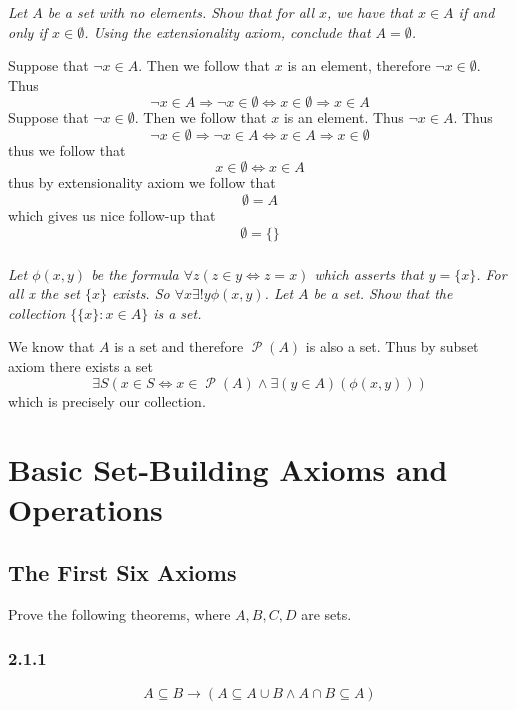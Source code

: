 \documentclass[11pt,oneside,titlepage]{book}
\DeclareMathOperator \pow {\mathcal {P}}
\DeclareMathOperator \lra {\Leftrightarrow}
\DeclareMathOperator \imp {\Rightarrow}
\begin{document}
\subsection{}

\textit{Let $A$ be a set with no elements. Show that for all $x$, we have that $x \in A$ if
  and only if $x \in \emptyset$. Using the extensionality axiom, conclude that $A = \emptyset$.}

Suppose that $\neg x \in A$. Then we follow that $x$ is an element, therefore $\neg x \in \emptyset$.
Thus
$$\neg x \in A \imp \neg x \in \emptyset \iff x \in \emptyset \imp x \in A$$
Suppose that $\neg x \in \emptyset$. Then we follow that $x$ is an element. Thus $\neg x \in A$.
Thus
$$\neg x \in \emptyset \imp \neg x \in A \iff x \in A \imp x \in  \emptyset$$
thus we follow that
$$x \in \emptyset \lra x \in A$$
thus by extensionality axiom we follow that
$$\emptyset = A$$
which gives us nice follow-up that
$$\emptyset = \{\}$$

\subsection{}

\textit{Let $\phi(x, y)$ be the formula $\forall z(z \in y \lra z = x)$ which asserts that
  $y = \{x\}$. For all x the set $\{x\}$ exists. So $\forall x  \exists! y \phi(x, y)$.
  Let $A$ be a set. Show that the collection $\{\{x\}: x \in A\}$ is a set.}

We know that $A$ is a set and therefore $\pow(A)$ is also a set. Thus by subset axiom
there exists a set 
$$\exists S (x \in S \lra x \in \pow(A) \land \exists(y \in A)(\phi(x, y)))$$
which is precisely our collection.

\chapter{Basic Set-Building Axioms and Operations}

\section{The First Six Axioms}

Prove the following theorems, where $A, B, C, D$ are sets.

\subsection*{2.1.1}

$$A \subseteq B \to (A \subseteq A \cup B \land A \cap B \subseteq A )$$
\end{document}
